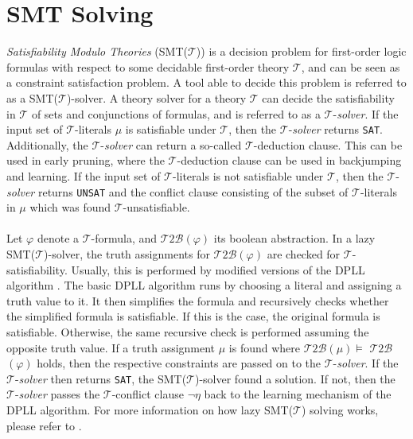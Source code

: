 \documentclass{amsart}
\theoremstyle{definition}
\theoremstyle{remark}
\numberwithin{equation}{section}
\def\T{$\mathcal{T}$}
\def\TtoB{$\mathcal{T}2\mathcal{B}$}
\def\TSolver{$\mathcal{T}$-\emph{solver}}
\def\sat{\texttt{SAT}}
\def\unsat{\texttt{UNSAT}}
\begin{document}
  \section{SMT Solving}
    \label{smtSolving}
    \emph{Satisfiability Modulo Theories} (SMT($\mathcal{T}$)) is a decision problem for first-order logic formulas with respect to some decidable first-order theory $\mathcal{T}$, and can be seen as a constraint satisfaction problem.
    A tool able to decide this problem is referred to as a SMT($\mathcal{T}$)-solver. A theory solver for a theory $\mathcal{T}$ can decide the satisfiability in $\mathcal{T}$ of sets and conjunctions of formulas, and is referred to as a $\mathcal{T}$-\emph{solver}.
    If the input set of \T{}-literals $\mu$ is satisfiable under \T{}, then the \TSolver{} returns \sat{}.
    Additionally, the \TSolver{} can return a so-called \T{}-deduction clause. This can be used in early pruning, where the \T{}-deduction clause can be used in backjumping and learning.
    If the input set of \T{}-literals is not satisfiable under \T{}, then the \TSolver{} returns \unsat{} and the conflict clause consisting of the subset of \T{}-literals in $\mu$ which was found \T{}-unsatisfiable.
    \\\\
    Let $\varphi$ denote a \T{}-formula, and \TtoB{}$(\varphi)$ its boolean abstraction. In a lazy SMT(\T{})-solver, the truth assignments for \TtoB{}$(\varphi)$ are checked for \T{}-satisfiability.
    Usually, this is performed by modified versions of the DPLL algorithm \cite{Davis60}. The basic DPLL algorithm runs by choosing a literal and assigning a truth value to it. It then simplifies the formula and  recursively checks whether the simplified formula is satisfiable.
    If this is the case, the original formula is satisfiable. Otherwise, the same recursive check is performed assuming the opposite truth value.
    If a truth assignment $\mu$ is found where \TtoB{}$(\mu) \models$ \TtoB{}$(\varphi)$ holds, then the respective constraints are passed on to the \TSolver{}.
    If the \TSolver{} then returns \sat{}, the SMT(\T{})-solver found a solution.
    If not, then the \TSolver{} passes the \T{}-conflict clause $\neg\eta$ back to the learning mechanism of the DPLL algorithm. For more information on how lazy SMT(\T{}) solving works, please refer to \cite{Sebastiani07}.
\end{document}
